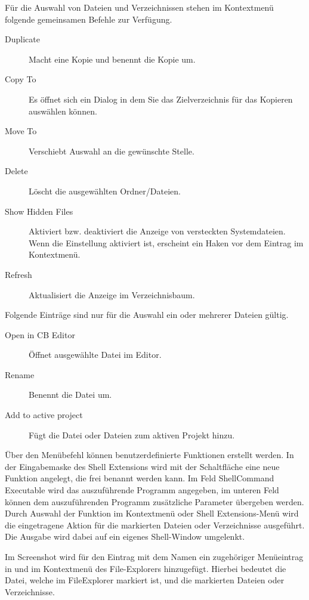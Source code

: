 Für die Auswahl von Dateien und Verzeichnissen stehen im Kontextmenü folgende gemeinsamen Befehle zur Verfügung.

\begin{description}
\item[Duplicate] Macht eine Kopie und benennt die Kopie um.
\item[Copy To] Es öffnet sich ein Dialog in dem Sie das Zielverzeichnis für das Kopieren auswählen können.
\item[Move To] Verschiebt Auswahl an die gewünschte Stelle.
\item[Delete] Löscht die ausgewählten Ordner/Dateien.
\item[Show Hidden Files] Aktiviert bzw. deaktiviert die Anzeige von versteckten Systemdateien. Wenn die Einstellung aktiviert ist, erscheint ein Haken vor dem Eintrag im Kontextmenü.
\item[Refresh] Aktualisiert die Anzeige im Verzeichnisbaum.
\end{description}

Folgende Einträge sind nur für die Auswahl ein oder mehrerer Dateien gültig.

\begin{description}
\item[Open in CB Editor] Öffnet ausgewählte Datei im \codeblocks Editor.
\item[Rename] Benennt die Datei um.
\item[Add to active project] Fügt die Datei oder Dateien zum aktiven Projekt hinzu.
\end{description}


Über den Menübefehl  können benutzerdefinierte Funktionen erstellt werden. In der Eingabemaske des Shell Extensions wird mit der Schaltfläche  eine neue Funktion angelegt, die frei benannt werden kann. Im Feld ShellCommand Executable wird das auszuführende Programm angegeben, im unteren Feld können dem auszuführenden Programm zusätzliche Parameter übergeben werden.
Durch Auswahl der Funktion im Kontextmenü oder Shell Extensions-Menü wird die eingetragene Aktion für die markierten Dateien oder Verzeichnisse ausgeführt. Die Ausgabe wird dabei auf ein eigenes Shell-Window umgelenkt.

Im Screenshot wird für den Eintrag mit dem Namen  ein zugehöriger Menüeintrag in  und im Kontextmenü des File-Explorers hinzugefügt. Hierbei bedeutet  die Datei, welche im FileExplorer markiert ist, und  die markierten Dateien oder Verzeichnisse.

